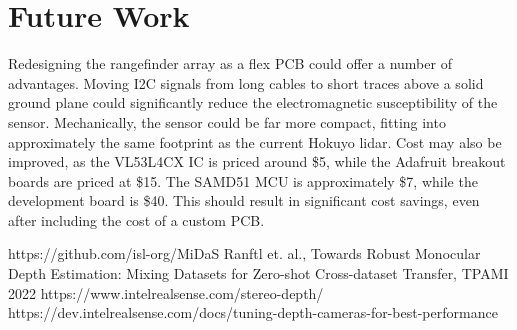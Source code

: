 \documentclass[conference]{IEEEtran}
\begin{document}
\section{Future Work}
Redesigning the rangefinder array as a flex PCB could offer a number of
advantages. Moving I2C signals from long cables to short traces above a solid
ground plane could significantly reduce the electromagnetic susceptibility of
the sensor. Mechanically, the sensor could be far more compact, fitting into
approximately the same footprint as the current Hokuyo lidar. Cost may also be
improved, as the VL53L4CX IC is priced around \$5, while the Adafruit breakout
boards are priced at \$15. The SAMD51 MCU is approximately \$7, while the
development board is \$40. This should result in significant cost savings, even
after including the cost of a custom PCB.



\begin{thebibliography}{00}
 https://github.com/isl-org/MiDaS
 Ranftl et. al., Towards Robust Monocular Depth Estimation:
Mixing Datasets for Zero-shot Cross-dataset Transfer, TPAMI 2022
 https://www.intelrealsense.com/stereo-depth/
 https://dev.intelrealsense.com/docs/tuning-depth-cameras-for-best-performance
\end{thebibliography}
\end{document}
